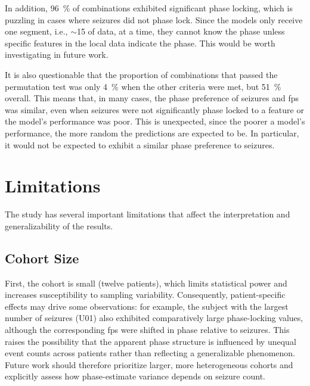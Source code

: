 In addition, \SI{96}{\percent} of combinations exhibited significant phase locking, which is puzzling in cases where seizures did not phase lock.
Since the models only receive one segment, i.e., $\sim$\SI{15}{\sec} of data, at a time, they cannot know the phase unless specific features in the local data indicate the phase.
This would be worth investigating in future work.

It is also questionable that the proportion of combinations that passed the permutation test was only \SI{4}{\percent} when the other criteria were met, but \SI{51}{\percent} overall.
This means that, in many cases, the phase preference of seizures and \glspl{fp} was similar, even when seizures were not significantly phase locked to a feature or the model's performance was poor.
This is unexpected, since the poorer a model's performance, the more random the predictions are expected to be.
In particular, it would not be expected to exhibit a similar phase preference to seizures.


\section{Limitations}
The study has several important limitations that affect the interpretation and generalizability of the results.

\subsection{Cohort Size} 
First, the cohort is small (twelve patients), which limits statistical power and increases susceptibility to sampling variability.
Consequently, patient-specific effects may drive some observations: for example, the subject with the largest number of seizures (U01) also exhibited comparatively large phase-locking values, although the corresponding \glspl{fp} were shifted in phase relative to seizures.
This raises the possibility that the apparent phase structure is influenced by unequal event counts across patients rather than reflecting a generalizable phenomenon.
Future work should therefore prioritize larger, more heterogeneous cohorts and explicitly assess how phase-estimate variance depends on seizure count.

